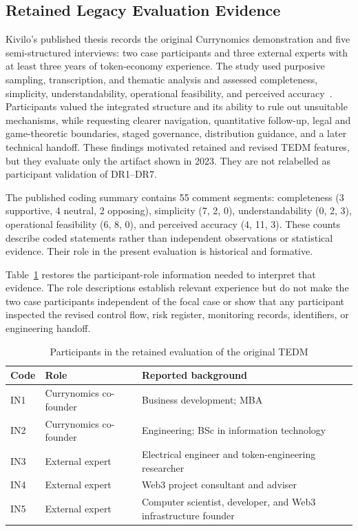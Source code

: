 \documentclass[referee,sn-basic]{sn-jnl}
\begin{document}
\subsection{Retained Legacy Evaluation Evidence}
\label{subsec:expert-evaluation}

Kivilo's published thesis records the original Currynomics demonstration and
five semi-structured interviews: two case participants and three external
experts with at least three years of token-economy experience. The study used
purposive sampling, transcription, and thematic analysis and assessed
completeness, simplicity, understandability, operational feasibility, and
perceived accuracy~\cite{Kivilo2023TokenEconomy,Braun2014}. Participants valued
the integrated structure and its ability to rule out unsuitable mechanisms,
while requesting clearer navigation, quantitative follow-up, legal and
game-theoretic boundaries, staged governance, distribution guidance, and a
later technical handoff. These findings motivated retained and revised TEDM
features, but they evaluate only the artifact shown in 2023. They are not
relabelled as participant validation of DR1--DR7.

The published coding summary contains 55 comment segments: completeness
(3 supportive, 4 neutral, 2 opposing), simplicity (7, 2, 0),
understandability (0, 2, 3), operational feasibility (6, 8, 0), and perceived
accuracy (4, 11, 3). These counts describe coded statements rather than
independent observations or statistical evidence. Their role in the present
evaluation is historical and formative.

Table~\ref{tab:legacy-participants} restores the participant-role information
needed to interpret that evidence. The role descriptions establish relevant
experience but do not make the two case participants independent of the focal
case or show that any participant inspected the revised control flow, risk
register, monitoring records, identifiers, or engineering handoff.

\begin{table}[t]
\caption{Participants in the retained evaluation of the original TEDM}
\label{tab:legacy-participants}
\centering
\footnotesize
\begin{tabularx}{\linewidth}{@{}p{.10\linewidth}p{.35\linewidth}X@{}}
\toprule
Code & Role & Reported background \\
\midrule
IN1 & Currynomics co-founder & Business development; MBA \\
IN2 & Currynomics co-founder & Engineering; BSc in information technology \\
IN3 & External expert & Electrical engineer and token-engineering researcher \\
IN4 & External expert & Web3 project consultant and adviser \\
IN5 & External expert & Computer scientist, developer, and Web3 infrastructure founder \\
\bottomrule
\end{tabularx}
\end{table}
\end{document}
